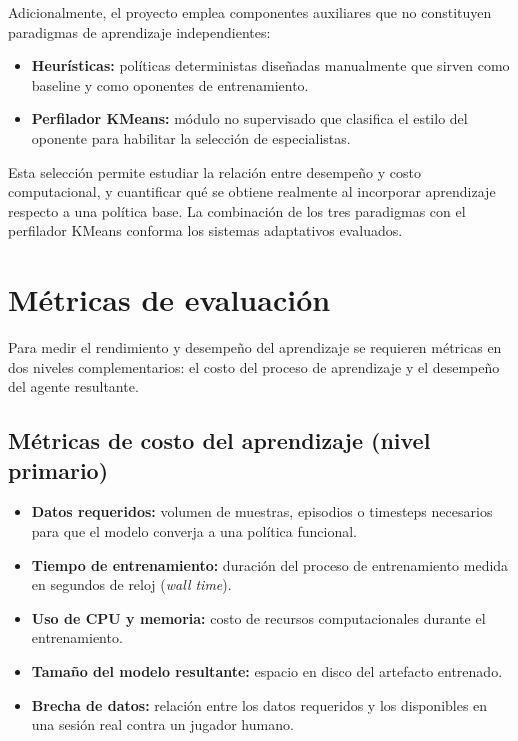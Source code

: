 Adicionalmente, el proyecto emplea componentes auxiliares que no constituyen paradigmas de aprendizaje independientes:

\begin{itemize}
    \item \textbf{Heurísticas:} políticas deterministas diseñadas manualmente que sirven como baseline y como oponentes de entrenamiento.
    \item \textbf{Perfilador KMeans:} módulo no supervisado que clasifica el estilo del oponente para habilitar la selección de especialistas.
\end{itemize}

Esta selección permite estudiar la relación entre desempeño y costo computacional, y cuantificar qué se obtiene realmente al incorporar aprendizaje respecto a una política base. La combinación de los tres paradigmas con el perfilador KMeans conforma los sistemas adaptativos evaluados.

\section{Métricas de evaluación}

Para medir el rendimiento y desempeño del aprendizaje se requieren métricas en dos niveles complementarios: el costo del proceso de aprendizaje y el desempeño del agente resultante.

\subsection{Métricas de costo del aprendizaje (nivel primario)}

\begin{itemize}
    \item \textbf{Datos requeridos:} volumen de muestras, episodios o timesteps necesarios para que el modelo converja a una política funcional.
    \item \textbf{Tiempo de entrenamiento:} duración del proceso de entrenamiento medida en segundos de reloj (\textit{wall time}).
    \item \textbf{Uso de CPU y memoria:} costo de recursos computacionales durante el entrenamiento.
    \item \textbf{Tamaño del modelo resultante:} espacio en disco del artefacto entrenado.
    \item \textbf{Brecha de datos:} relación entre los datos requeridos y los disponibles en una sesión real contra un jugador humano.
\end{itemize}

